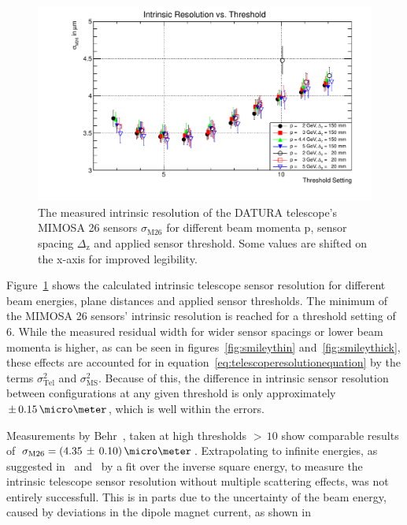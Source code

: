 \begin{figure}[hbtp]
\centering

\includegraphics[width=\textwidth]{figures/resi_thresh_errors.pdf}
\caption[Telescope intrinsic sensor resolution for different threshold settings,
beam momenta and geometries]{The measured intrinsic resolution of the DATURA
telescope's MIMOSA 26 sensors $\sigma_{\textrm{M26}}$ for different beam momenta
p, sensor spacing $\Delta_{\textrm{z}}$ and applied sensor threshold. Some
values are shifted on the x-axis for improved legibility.}
\label{fig:resivsenergy}
\end{figure}

Figure~\ref{fig:resivsenergy} shows the calculated intrinsic telescope sensor
resolution for different beam energies, plane distances and applied sensor
thresholds. The minimum of the MIMOSA 26 sensors' intrinsic resolution is
reached for a threshold setting of $6$. While the measured residual width for
wider sensor spacings or lower beam momenta is higher, as can be seen in
figures~\ref{fig:smileythin} and~\ref{fig:smileythick}, these effects are
accounted for in equation~\ref{eq:telescoperesolutionequation} by the terms
$\sigma_{\textrm{Tel}}^2$ and $\sigma_{\textrm{MS}}^2$. Because of this, the
difference in intrinsic sensor resolution between configurations at any given
threshold is only approximately $\pm\,0.15\,\micro\meter$, which is well within
the errors.


Measurements by Behr~\cite{ref:j.behrmeasurements}, taken at high thresholds
$>\,10$ show comparable results of $\sigma_{\textrm{M26}} =
(4.35\,\pm\,0.10)\,\micro\meter$. Extrapolating to infinite energies, as
suggested in~\cite{ref:cmosbeamtest} and~\cite{ref:moritzthesis} by a fit over
the inverse square energy, to measure the intrinsic telescope sensor resolution
without multiple scattering effects, was not entirely successfull. 
This is in
parts due to the uncertainty of the beam energy, caused by deviations in the
dipole magnet current, as shown in~\cite{ref:summerstudentbrm}

